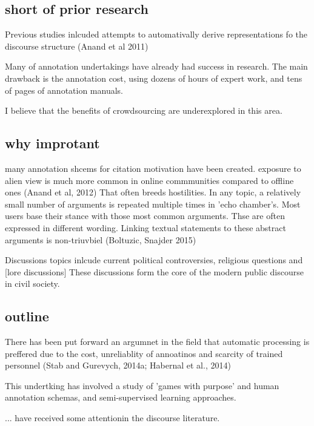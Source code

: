 \documentclass{article}
\begin{document}
\subsection{short of prior research}
Previous studies inlcuded attempts to automativally derive representations fo the discourse structure (Anand et al 2011)

Many of annotation undertakings have already had success in research. The main drawback is the annotation cost, using dozens of hours of expert work, and tens of pages of annotation manuals.

I believe that the benefits of crowdsourcing are underexplored in this area.

\subsection{why improtant}
many annotation shcems for citation motivation have been created.
exposure to alien view is much more common in online commmunities compared to offline ones (Anand et al, 2012)
That often breeds hostilities.
In any topic, a relatively small number of arguments is repeated multiple times in 'echo chamber's. Most users base their stance with those most common arguments. 
Thse are often expressed in different wording.
Linking textual statements to these abstract arguments is non-triuvbiel (Boltuzic, Snajder 2015)

Discussions topics inlcude current political controversies, religious questions and [lore discussions]
These discussions form the core of the modern public discourse in civil society. 

\subsection{outline}

There has been put forward an argumnet in the field that automatic processing is preffered due to the cost, unreliablity of annoatinos and scarcity of trained personnel
(Stab and Gurevych, 2014a; Habernal et al., 2014)

This undertking has involved a study of 'games with purpose' and human annotation schemas, and semi-supervised learning approaches.

... have received some attentionin the discourse literature.
\end{document}
